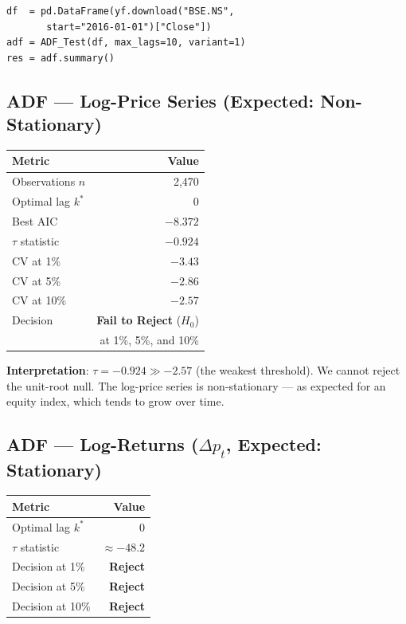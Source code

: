 \documentclass[10pt,a4paper,twocolumn]{article}
\begin{document}
\begin{lstlisting}[style=pythonplain]
df  = pd.DataFrame(yf.download("BSE.NS",
       start="2016-01-01")["Close"])
adf = ADF_Test(df, max_lags=10, variant=1)
res = adf.summary()
\end{lstlisting}

\subsection{ADF --- Log-Price Series (Expected: Non-Stationary)}

\begin{tcolorbox}[resultbox={ADF Output --- variant=1 (constant only)}]
\begin{center}\small
\begin{tabular}{@{}lr@{}}
\toprule
Metric & Value\\\midrule
Observations $n$  & 2,470\\
Optimal lag $k^*$ & 0\\
Best AIC          & $-8.372$\\
$\tau$ statistic  & $-0.924$\\\midrule
CV at 1\%   & $-3.43$\\
CV at 5\%   & $-2.86$\\
CV at 10\%  & $-2.57$\\\midrule
Decision    & \textbf{Fail to Reject} ($H_0$)\\
            & at 1\%, 5\%, and 10\%\\\bottomrule
\end{tabular}
\end{center}
\end{tcolorbox}

\textbf{Interpretation}: $\tau = -0.924 \gg -2.57$ (the weakest
threshold).  We cannot reject the unit-root null.  The log-price
series is non-stationary --- as expected for an equity index, which
tends to grow over time.

\subsection{ADF --- Log-Returns (\texorpdfstring{$\Delta p_t$}{Delta-pt}, Expected: Stationary)}

\begin{tcolorbox}[resultbox={ADF on First-Differenced Log-Prices}]
\begin{center}\small
\begin{tabular}{@{}lr@{}}
\toprule
Metric & Value\\\midrule
Optimal lag $k^*$ & 0\\
$\tau$ statistic  & $\approx -48.2$\\\midrule
Decision at 1\%  & \textbf{Reject}\\
Decision at 5\%  & \textbf{Reject}\\
Decision at 10\% & \textbf{Reject}\\\bottomrule
\end{tabular}
\end{center}
\end{tcolorbox}
\end{document}
